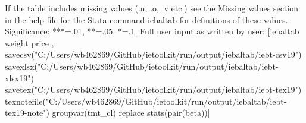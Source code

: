 If the table includes missing values (.n, .o, .v etc.) see the Missing values section in the help file for the Stata command iebaltab for definitions of these values. Significance: ***=.01, **=.05, *=.1. Full user input as written by user: [iebaltab weight price , savecsv("C:/Users/wb462869/GitHub/ietoolkit/run/output/iebaltab/iebt-csv19") savexlsx("C:/Users/wb462869/GitHub/ietoolkit/run/output/iebaltab/iebt-xlsx19") savetex("C:/Users/wb462869/GitHub/ietoolkit/run/output/iebaltab/iebt-tex19") texnotefile("C:/Users/wb462869/GitHub/ietoolkit/run/output/iebaltab/iebt-tex19-note") groupvar(tmt\_cl) replace stats(pair(beta))]
